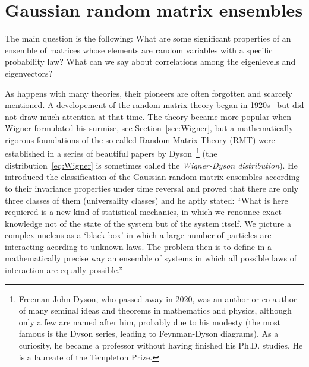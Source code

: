 \documentclass[a4paper,11pt,twoside]{article}
\begin{document}
\section{Gaussian random matrix ensembles}
    The main question is the following: 
    What are some significant properties of an ensemble of matrices whose elements are random variables with a specific probability law? 
    What can we say about correlations among the eigenlevels and eigenvectors?
    
    As happens with many theories, their pioneers are often forgotten and scarcely mentioned. 
    A developement of the random matrix theory began in 1920s~\cite{Wis28} but did not draw much attention at that time.
    The theory became more popular when Wigner formulated his surmise, see Section~\ref{sec:Wigner},
    but a mathematically rigorous foundations of the so called Random Matrix Theory (RMT) were established in a series of beautiful papers by Dyson~\cite{Dys62}\footnote{
        Freeman John Dyson, who passed away in 2020, was an author or co-author of many seminal ideas and theorems in mathematics and physics, although only a few are named after him, probably due to his modesty (the most famous is the Dyson series, leading to Feynman-Dyson diagrams). As a curiosity, he became a professor without having finished his Ph.D. studies.
        He is a laureate of the Templeton Prize.
    }
    (the distribution~\eqref{eq:Wigner} is sometimes called the \emph{Wigner-Dyson distribution}).
    He introduced the classification of the Gaussian random matrix ensembles according to their invariance properties under time reversal and proved that there are only three classes of them (universality classes) and he aptly stated: ``What is here requiered is a new kind of statistical mechanics, in which we renounce exact knowledge not of the state of the system but of the system itself.
    We picture a complex nucleus as a `black box' in which a large number of particles are interacting acording to unknown laws.
    The problem then is to define in a mathematically precise way an ensemble of systems in which all possible laws of interaction are equally possible.''
\end{document}
